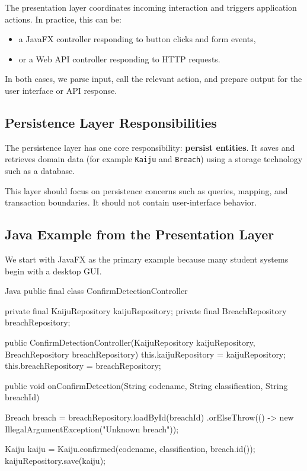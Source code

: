 The presentation layer coordinates incoming interaction and triggers application actions. In practice, this can be:
\begin{itemize}
    \item a JavaFX controller responding to button clicks and form events,
    \item or a Web API controller responding to HTTP requests.
\end{itemize}

In both cases, we parse input, call the relevant action, and prepare output for the user interface or API response.

\subsection{Persistence Layer Responsibilities}
\label{sec:2_layered_persistence_responsibilities}

The persistence layer has one core responsibility: \textbf{persist entities}. It saves and retrieves domain data (for example \texttt{Kaiju} and \texttt{Breach}) using a storage technology such as a database.

This layer should focus on persistence concerns such as queries, mapping, and transaction boundaries. It should not contain user-interface behavior.

\subsection{Java Example from the Presentation Layer}
\label{sec:2_layered_javafx_example}

We start with JavaFX as the primary example because many student systems begin with a desktop GUI.

\begin{ridercode}{Java}
public final class ConfirmDetectionController {
    private final KaijuRepository kaijuRepository;
    private final BreachRepository breachRepository;

    public ConfirmDetectionController(KaijuRepository kaijuRepository,
                                      BreachRepository breachRepository) {
        this.kaijuRepository = kaijuRepository;
        this.breachRepository = breachRepository;
    }

    public void onConfirmDetection(String codename,
                                   String classification,
                                   String breachId) {
        Breach breach = breachRepository.loadById(breachId)
                .orElseThrow(() -> new IllegalArgumentException("Unknown breach"));

        Kaiju kaiju = Kaiju.confirmed(codename, classification, breach.id());
        kaijuRepository.save(kaiju);
    }
}
\end{ridercode}

